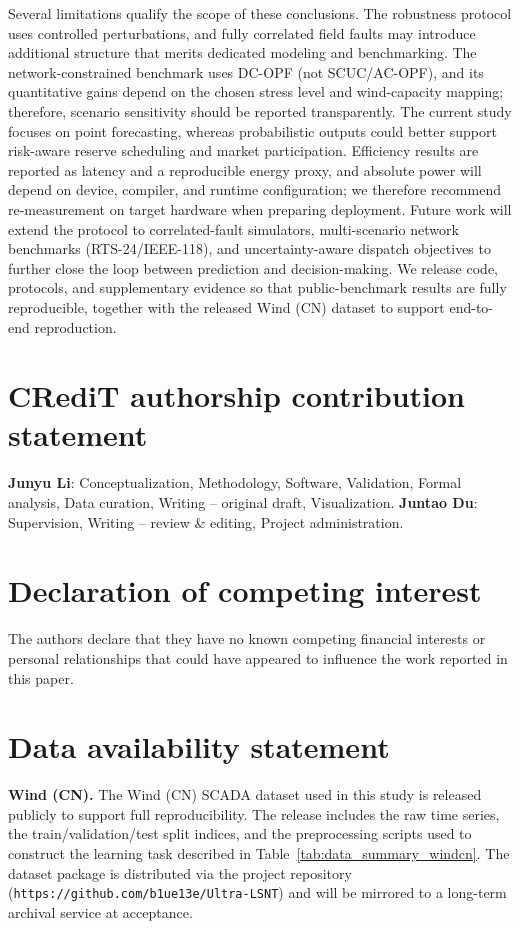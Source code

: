\documentclass[review,3p,times]{elsarticle}
\begin{document}
Several limitations qualify the scope of these conclusions. The robustness protocol uses controlled perturbations, and fully correlated field faults may introduce additional structure that merits dedicated modeling and benchmarking. The network-constrained benchmark uses DC-OPF (not SCUC/AC-OPF), and its quantitative gains depend on the chosen stress level and wind-capacity mapping; therefore, scenario sensitivity should be reported transparently. The current study focuses on point forecasting, whereas probabilistic outputs could better support risk-aware reserve scheduling and market participation. Efficiency results are reported as latency and a reproducible energy proxy, and absolute power will depend on device, compiler, and runtime configuration; we therefore recommend re-measurement on target hardware when preparing deployment. Future work will extend the protocol to correlated-fault simulators, multi-scenario network benchmarks (RTS-24/IEEE-118), and uncertainty-aware dispatch objectives to further close the loop between prediction and decision-making. We release code, protocols, and supplementary evidence so that public-benchmark results are fully reproducible, together with the released Wind (CN) dataset to support end-to-end reproduction.

\section*{CRediT authorship contribution statement}
\textbf{Junyu Li}: Conceptualization, Methodology, Software, Validation, Formal analysis, Data curation, Writing -- original draft, Visualization.
\textbf{Juntao Du}: Supervision, Writing -- review \& editing, Project administration.

\section*{Declaration of competing interest}
The authors declare that they have no known competing financial interests or personal relationships that could have appeared to influence the work reported in this paper.

\section*{Data availability statement}
\textbf{Wind (CN).} The Wind (CN) SCADA dataset used in this study is released publicly to support full reproducibility. The release includes the raw time series, the train/validation/test split indices, and the preprocessing scripts used to construct the learning task described in Table~\ref{tab:data_summary_windcn}. The dataset package is distributed via the project repository (\texttt{https://github.com/b1ue13e/Ultra-LSNT}) and will be mirrored to a long-term archival service at acceptance.
\end{document}
